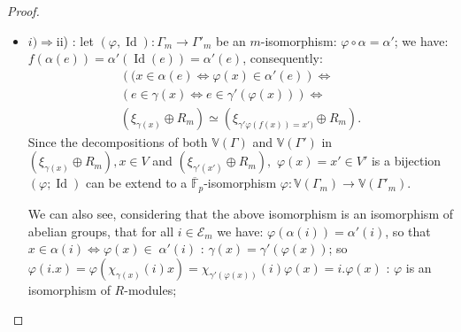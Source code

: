 \documentclass[10pt,a4paper]{amsart}
\DeclareMathOperator{\Id}{Id}
\begin{document}
\begin{proof}\mbox{}

\begin{itemize}
\item[-] $i)\Longrightarrow $ii) : let $(\varphi, \Id) : \Gamma_m \longrightarrow \Gamma'_m$ be an $m$-isomorphism: $\varphi \circ \alpha=\alpha'$; we have: 
$f(\alpha(e))=\alpha'(\Id(e))= \alpha'(e)$, consequently:
\begin{equation*}
\begin{array}{l}
\left((x\in \alpha(e)\Longleftrightarrow \varphi(x)\in \alpha'(e)\right)\Longleftrightarrow\\
\left(e\in \gamma(x)\Longleftrightarrow  e\in \gamma'(\varphi(x))\right)\Longleftrightarrow\\
 \left(\xi_{\gamma(x)}\oplus R_m\right)\simeq \left(\xi_{\gamma'\varphi(f(x))=x')}\oplus R_m\right).  
\end{array}
\end{equation*}
Since the decompositions of  both $\mathbb{V}(\Gamma)$ and $\mathbb{V}(\Gamma')$  in $\left(\xi_{\gamma(x)}\oplus R_m\right), x\in V$ and  
$\left(\xi_{\gamma'(x')}\oplus R_m\right),$ $\varphi(x)=x'\in V'$ is a bijection $(\varphi; \Id)$  can be extend to a $\overline{\mathbb{F}}_p$-isomorphism 
$\varphi : \mathbb{V}(\Gamma_m) \longrightarrow \mathbb{V}(\Gamma'_m)$.
  
 \noindent We can also see, considering that the above isomorphism is an isomorphism of abelian groups,   that for all $i\in\mathcal{E}_m$ we have:  ${\displaystyle \varphi(\alpha(i))=\alpha'(i)}$, so that
${\displaystyle  x \in \alpha(i) \Longleftrightarrow \varphi(x)\in \; \alpha'(i)}$ : 
${\displaystyle  \gamma(x)=\gamma'(\varphi(x))}$; so ${\displaystyle  \varphi(i.x)=\varphi(\chi_{\gamma(x)}(i)x)=\chi_{\gamma'(\varphi(x))}(i)\varphi(x)=i.\varphi(x)}$ : $\varphi$ is an isomorphism of $R$-modules;



\end{itemize}
\end{proof}
\end{document}
